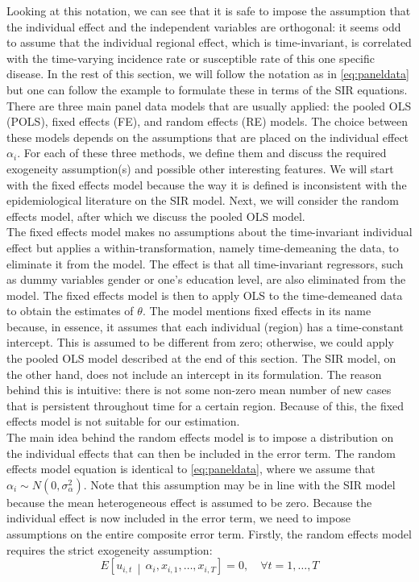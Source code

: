 \documentclass[12pt]{article}
\begin{document}
	Looking at this notation, we can see that it is safe to impose the assumption that the individual effect and the independent variables are orthogonal: it seems odd to assume that the individual regional effect, which is time-invariant, is correlated with the time-varying incidence rate or susceptible rate of this one specific disease. In the rest of this section, we will follow the notation as in \eqref{eq:paneldata} but one can follow the example to formulate these in terms of the SIR equations. \\
	
	There are three main panel data models that are usually applied: the pooled OLS (POLS), fixed effects (FE), and random effects (RE) models. The choice between these models depends on the assumptions that are placed on the individual effect $\alpha_i$. For each of these three methods, we define them and discuss the required exogeneity assumption(s) and possible other interesting features. We will start with the fixed effects model because the way it is defined is inconsistent with the epidemiological literature on the SIR model. Next, we will consider the random effects model, after which we discuss the pooled OLS model. \\
	
	The fixed effects model makes no assumptions about the time-invariant individual effect but applies a within-transformation, namely time-demeaning the data, to eliminate it from the model. The effect is that all time-invariant regressors, such as dummy variables gender or one's education level, are also eliminated from the model. The fixed effects model is then to apply OLS to the time-demeaned data to obtain the estimates of $\theta$. The model mentions fixed effects in its name because, in essence, it assumes that each individual (region) has a time-constant intercept. This is assumed to be different from zero; otherwise, we could apply the pooled OLS model described at the end of this section. The SIR model, on the other hand, does not include an intercept in its formulation. The reason behind this is intuitive: there is not some non-zero mean number of new cases that is persistent throughout time for a certain region. Because of this, the fixed effects model is not suitable for our estimation. \\
	
	The main idea behind the random effects model is to impose a distribution on the individual effects that can then be included in the error term. The random effects model equation is identical to \eqref{eq:paneldata}, where we assume that $\alpha_i \sim N\left(0, \sigma^2_{\alpha}\right)$. Note that this assumption may be in line with the SIR model because the mean heterogeneous effect is assumed to be zero. Because the individual effect is now included in the error term, we need to impose assumptions on the entire composite error term. Firstly, the random effects model requires the strict exogeneity assumption:
	    \begin{equation}\label{eq:strict_exogeneity}
	        E\left[u_{i,t} \,\middle|\, \alpha_i, x_{i,1}, \dotsc, x_{i, T}\right] = 0, \quad\forall t=1,\dotsc,T 
	    \end{equation}
	    
\end{document}
